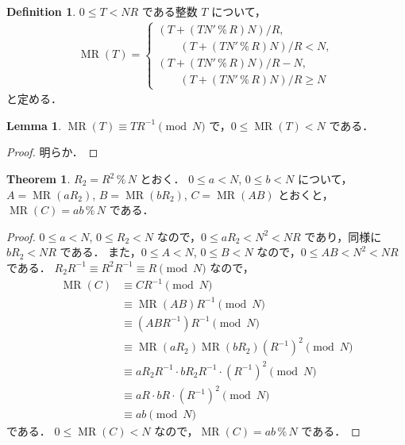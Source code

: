 \documentclass[twocolumn, uplatex, dvipdfmx]{jsarticle}
\renewcommand{\ge}{\geqslant}
\renewcommand{\le}{\leqslant}
\numberwithin{equation}{section}
\theoremstyle{definition}
\newtheorem{thm}{Theorem}[section]
\newtheorem{lem}{Lemma}[section]
\newtheorem{dfn}{Definition}[section]
\newcommand{\Mod}{\,\texttt{\%}\,}
\DeclareMathOperator{\MR}{\mathrm{MR}}
\begin{document}
\begin{dfn}
	$0\le T<NR$ である整数 $T$ について，
	\begin{align*}
		\MR(T)=\begin{cases}
			(T+(TN'\Mod R)N)/R,\\
			\qquad (T+(TN'\Mod R)N)/R<N,\\
			(T+(TN'\Mod R)N)/R-N,\\
			\qquad (T+(TN'\Mod R)N)/R\ge N
		\end{cases}
	\end{align*}
	と定める．
\end{dfn}

\begin{lem}
	$\MR(T)\equiv TR^{-1}\pmod{N}$ で，$0\le \MR(T)<N$ である．
\end{lem}
\begin{proof}
	明らか．
\end{proof}

\begin{thm}
	$R_2=R^2\Mod N$ とおく．
	$0\le a<N$, $0\le b<N$ について，$A=\MR(aR_2)$, $B=\MR(bR_2)$, $C=\MR(AB)$ とおくと，$\MR(C)=ab\Mod N$ である．
\end{thm}
\begin{proof}
	$0\le a<N$, $0\le R_2<N$ なので，$0\le aR_2<N^2<NR$ であり，同様に $bR_2<NR$ である．
	また，$0\le A<N$, $0\le B<N$  なので，$0\le AB<N^2<NR$ である．
	$R_2R^{-1}\equiv R^2R^{-1}\equiv R\pmod{N}$ なので，
	\begin{align*}
		\MR(C)&\equiv CR^{-1}\pmod{N}\\
		&\equiv\MR(AB)R^{-1}\pmod{N}\\
		&\equiv(ABR^{-1})R^{-1}\pmod{N}\\
		&\equiv\MR(aR_2)\MR(bR_2)(R^{-1})^2\pmod{N}\\
		&\equiv aR_2R^{-1}\cdot bR_2R^{-1}\cdot (R^{-1})^2\pmod{N}\\
		&\equiv aR\cdot bR\cdot (R^{-1})^2\pmod{N}\\
		&\equiv ab\pmod{N}
	\end{align*}
	である．
	$0\le \MR(C)<N$ なので，$\MR(C)=ab\Mod N$ である．
\end{proof}
\end{document}
